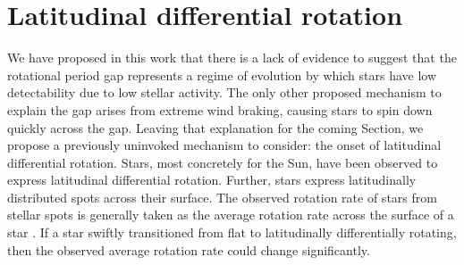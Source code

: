 \section{Latitudinal differential rotation}
\label{sec:lat_diff_rot}

We have proposed in this work that there is a lack of evidence to suggest that the rotational period gap represents a regime of evolution by which stars have low detectability due to low stellar activity.
The only other proposed mechanism to explain the gap arises from extreme wind braking, causing stars to spin down quickly across the gap.
Leaving that explanation for the coming Section, we propose a previously uninvoked mechanism to consider: the onset of latitudinal differential rotation.
Stars, most concretely for the Sun, have been observed to express latitudinal differential rotation.
Further, stars express latitudinally distributed spots across their surface.
The observed rotation rate of stars from stellar spots is generally taken as the average rotation rate across the surface of a star \citet{santos_surface_2021}.
If a star swiftly transitioned from flat to latitudinally differentially rotating, then the observed average rotation rate could change significantly.

